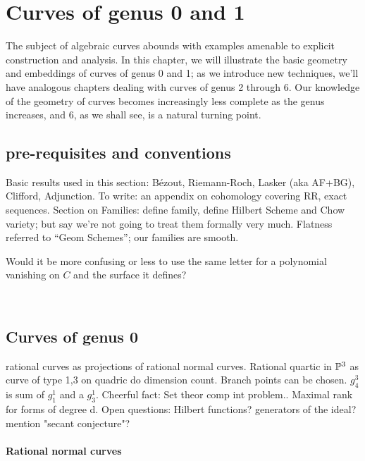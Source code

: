 

\chapter{Curves of genus 0 and 1}\label{genus 0 and 1 chapter}

The subject of algebraic curves abounds with examples amenable to explicit construction and analysis. In this chapter, we will illustrate  the basic geometry and embeddings of curves of genus 0 and 1; as we introduce new techniques, we'll have analogous chapters dealing with curves of genus 2 through 6. Our knowledge of the geometry of curves becomes increasingly less complete as the genus increases, and 6, as we shall see, is a natural turning point. 
\section{pre-requisites and conventions}


Basic results used in this section: B\'ezout, Riemann-Roch, Lasker (aka AF+BG), Clifford, Adjunction.
To write: an appendix on cohomology covering RR, exact sequences.
Section on Families: define family, define Hilbert Scheme and Chow variety;  but say we're not going to treat them formally very much. Flatness referred to ``Geom Schemes''; our families are smooth.


Would it be more confusing or less to use the same letter for a polynomial vanishing on $C$ and the surface it defines?

\




\section{Curves of genus 0} 

rational curves as projections of rational normal curves. Rational quartic in ${\mathbb P}^3$ as curve of type 1,3 on quadric do dimension count. Branch points can be chosen. $g^3_4$ is sum of $g^1_1$ and a $g^1_3$. Cheerful fact: Set theor comp int problem.. Maximal rank for forms of degree d. Open questions: Hilbert functions? generators of the ideal? mention "secant conjecture"?

\subsubsection{Rational normal curves}

